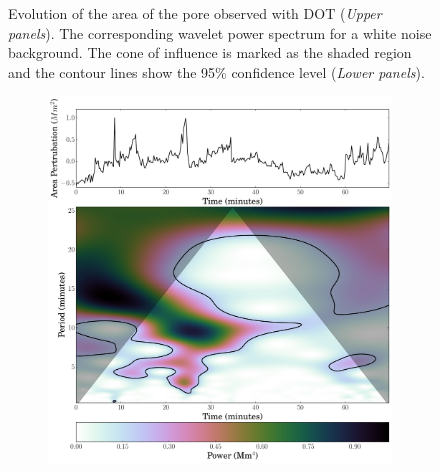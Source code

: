 \begin{figure}
\begin{subfigure}[b]{0.45\textwidth}
        \end{subfigure}
        \caption{Evolution of the area of the pore observed with DOT (\textit{Upper panels}).
            The corresponding wavelet power spectrum for a white noise background.
            The cone of influence is marked as the shaded region and the contour lines show the 95\% confidence level (\textit{Lower panels}).}
        \label{DOT_wls}
    \end{figure}
    
    \begin{figure}
        \centering
        \begin{subfigure}[b]{0.45\textwidth}
            \includegraphics[width=\textwidth]{rosa_area.pdf}
        \end{subfigure}
        \begin{subfigure}[b]{0.45\textwidth}

\end{subfigure}
\end{figure}
